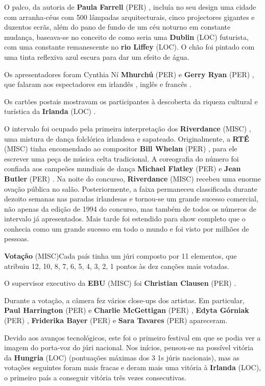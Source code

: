 \documentclass[12pt,a4paper]{article}
\begin{document}
O palco, da autoria de \textbf{Paula Farrell} (PER) , incluía no seu design uma cidade com arranha-céus com 500 lâmpadas arquitecturais, cinco projectores gigantes e duzentos ecrãs, além do pano de fundo de um céu noturno em constante mudança, baseava-se no conceito de como seria uma \textbf{Dublin} (LOC) futurista, com uma constante remanescente no \textbf{rio Liffey} (LOC). O chão foi pintado com uma tinta reflexiva azul escura para dar um efeito de água.

Os apresentadores foram Cynthia Ní \textbf{Mhurchú} (PER) e \textbf{Gerry Ryan} (PER) , que falaram aos espectadores em irlandês , inglês e francês .

Os cartões postais mostravam os participantes à descoberta da riqueza cultural e turística da \textbf{Irlanda} (LOC) .

O intervalo foi ocupado pela primeira interpretação dos \textbf{Riverdance} (MISC) , uma mistura de dança folclórica irlandesa e sapateado. Originalmente, a \textbf{RTÉ} (MISC) tinha encomendado ao compositor \textbf{Bill Whelan} (PER) , para ele escrever uma peça de música celta tradicional. A coreografia do número foi confiada aos campeões mundiais de dança \textbf{Michael Flatley} (PER) e \textbf{Jean Butler} (PER) . Na noite do concurso, \textbf{Riverdance} (MISC) recebeu uma enorme ovação pública no salão. Posteriormente, a faixa permaneceu classificada durante dezoito semanas nas paradas irlandesas e tornou-se um grande sucesso comercial, não apenas da edição de 1994 do concurso, mas também de todos os números de intervalo já apresentados. Mais tarde foi estendido para show completo que o conhecia como um grande sucesso em todo o mundo e foi visto por milhões de pessoas.



\textbf{Votação} (MISC)Cada país tinha um júri composto por 11 elementos, que atribuiu 12, 10, 8, 7, 6, 5, 4, 3, 2, 1 pontos às dez canções mais votadas.

O supervisor executivo da \textbf{EBU} (MISC) foi \textbf{Christian Clausen} (PER) .

Durante a votação, a câmera fez vários close-ups dos artistas. Em particular, \textbf{Paul Harrington} (PER) e \textbf{Charlie McGettigan} (PER) , \textbf{Edyta Górniak} (PER) , \textbf{Friderika Bayer} (PER) e \textbf{Sara Tavares} (PER) apareceram.

Devido aos avanços tecnológicos, este foi o primeiro festival em que se podia ver a imagem do porta-voz do júri nacional. Nos inícios, pensou-se na possível vitória da \textbf{Hungria} (LOC) (pontuações máximas dos 3 1s júris nacionais), mas as votações seguintes foram mais fracas e deram mais uma vitória à \textbf{Irlanda} (LOC), o primeiro país a conseguir vitória três vezes consecutivas.
\end{document}
